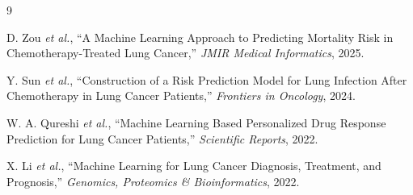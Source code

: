 \documentclass[journal]{IEEEtran}
\begin{document}
\begin{thebibliography}{9}

D. Zou \emph{et al.}, ``A Machine Learning Approach to Predicting Mortality Risk in Chemotherapy-Treated Lung Cancer,'' \emph{JMIR Medical Informatics}, 2025.

Y. Sun \emph{et al.}, ``Construction of a Risk Prediction Model for Lung Infection After Chemotherapy in Lung Cancer Patients,'' \emph{Frontiers in Oncology}, 2024.

W. A. Qureshi \emph{et al.}, ``Machine Learning Based Personalized Drug Response Prediction for Lung Cancer Patients,'' \emph{Scientific Reports}, 2022.

X. Li \emph{et al.}, ``Machine Learning for Lung Cancer Diagnosis, Treatment, and Prognosis,'' \emph{Genomics, Proteomics \& Bioinformatics}, 2022.

\end{thebibliography}
\end{document}
